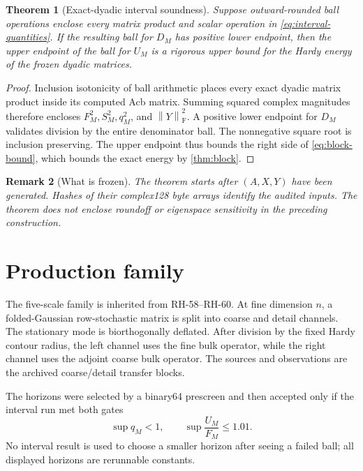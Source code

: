 \documentclass[11pt]{article}
\newtheorem{theorem}{Theorem}[section]
\newtheorem{remark}[theorem]{Remark}
\theoremstyle{definition}
\newcommand{\norm}[1]{\left\lVert#1\right\rVert}
\newcommand{\F}{\mathrm F}
\begin{document}
\begin{theorem}[Exact-dyadic interval soundness]
\label{thm:interval}
Suppose outward-rounded ball operations enclose every matrix product and
scalar operation in \eqref{eq:interval-quantities}.  If the resulting ball
for $D_M$ has positive lower endpoint, then the upper endpoint of the ball
for $U_M$ is a rigorous upper bound for the Hardy energy of the frozen dyadic
matrices.
\end{theorem}

\begin{proof}
Inclusion isotonicity of ball arithmetic places every exact dyadic matrix
product inside its computed Acb matrix.  Summing squared complex magnitudes
therefore encloses $F_M^2,S_M^2,q_M^2$, and $\norm{Y}_{\F}^2$.  A positive
lower endpoint for $D_M$ validates division by the entire denominator ball.
The nonnegative square root is inclusion preserving.  The upper endpoint
thus bounds the right side of \eqref{eq:block-bound}, which bounds the exact
energy by \cref{thm:block}.
\end{proof}

\begin{remark}[What is frozen]
The theorem starts after $(A,X,Y)$ have been generated.  Hashes of their
complex128 byte arrays identify the audited inputs.  The theorem does not
enclose roundoff or eigenspace sensitivity in the preceding construction.
\end{remark}

\section{Production family}
\label{sec:family}

The five-scale family is inherited from RH-58--RH-60.  At fine dimension
$n$, a folded-Gaussian row-stochastic matrix is split into coarse and detail
channels.  The stationary mode is biorthogonally deflated.  After division by
the fixed Hardy contour radius, the left channel uses the fine bulk operator,
while the right channel uses the adjoint coarse bulk operator.  The sources
and observations are the archived coarse/detail transfer blocks.

The horizons were selected by a binary64 prescreen and then accepted only if
the interval run met both gates
\begin{equation}
 \sup q_M<1,
 \qquad
 \sup\frac{U_M}{F_M}\le1.01.
 \label{eq:gates}
\end{equation}
No interval result is used to choose a smaller horizon after seeing a failed
ball; all displayed horizons are rerunnable constants.
\end{document}
